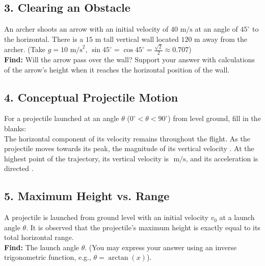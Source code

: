 \documentclass[12pt]{article}
\begin{document}
\newpage

\subsection*{3. Clearing an Obstacle}
An archer shoots an arrow with an initial velocity of $40 \text{ m/s}$ at an angle of $45^\circ$ to the horizontal. There is a $15 \text{ m}$ tall vertical wall located $120 \text{ m}$ away from the archer. (Take $g = 10 \text{ m/s}^2$, $\sin 45^\circ = \cos 45^\circ = \frac{\sqrt{2}}{2} \approx 0.707$) \\

\textbf{Find:} Will the arrow pass over the wall? Support your answer with calculations of the arrow's height when it reaches the horizontal position of the wall.

\newpage

\subsection*{4. Conceptual Projectile Motion}
For a projectile launched at an angle $\theta$ ($0^\circ < \theta < 90^\circ$) from level ground, fill in the blanks: \\
The horizontal component of its velocity remains \underline{\hspace{3cm}} throughout the flight. As the projectile moves towards its peak, the magnitude of its vertical velocity \underline{\hspace{3cm}}. At the highest point of the trajectory, its vertical velocity is \underline{\hspace{2cm}} $\text{ m/s}$, and its acceleration is \underline{\hspace{3cm}} directed \underline{\hspace{3cm}}. 

\vspace{10cm}

\subsection*{5. Maximum Height vs. Range}
A projectile is launched from ground level with an initial velocity $v_0$ at a launch angle $\theta$. It is observed that the projectile's maximum height is exactly equal to its total horizontal range. \\

\textbf{Find:} The launch angle $\theta$. (You may express your answer using an inverse trigonometric function, e.g., $\theta = \arctan(x)$).
\end{document}
